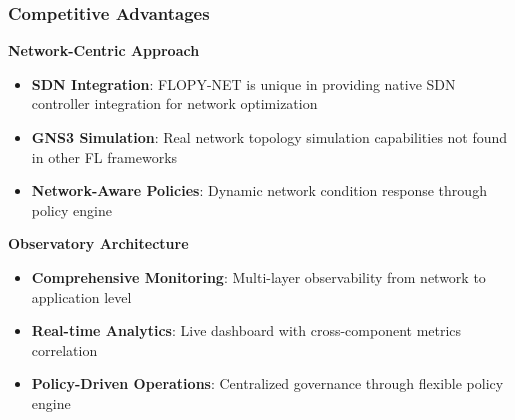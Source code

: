 \begin{table}[H]
\centering
\caption{Comparison of Federated Learning Frameworks}
\label{tab:fl-framework-comparison}
\end{table}

\subsubsection{Competitive Advantages}

\textbf{Network-Centric Approach}
\begin{itemize}
    \item \textbf{SDN Integration}: FLOPY-NET is unique in providing native SDN controller integration for network optimization
    \item \textbf{GNS3 Simulation}: Real network topology simulation capabilities not found in other FL frameworks
    \item \textbf{Network-Aware Policies}: Dynamic network condition response through policy engine
\end{itemize}

\textbf{Observatory Architecture}
\begin{itemize}
    \item \textbf{Comprehensive Monitoring}: Multi-layer observability from network to application level
    \item \textbf{Real-time Analytics}: Live dashboard with cross-component metrics correlation
    \item \textbf{Policy-Driven Operations}: Centralized governance through flexible policy engine
\end{itemize}

